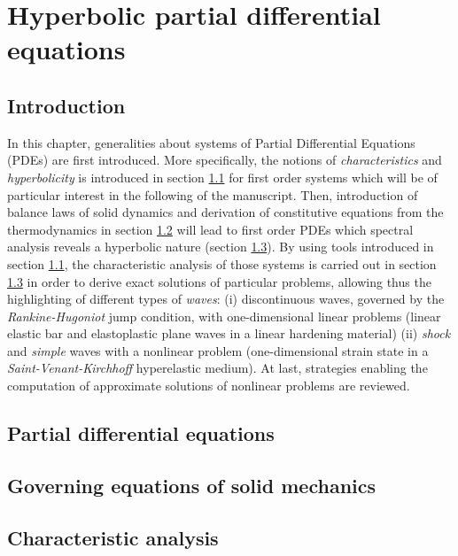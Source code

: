 \chapter{Hyperbolic partial differential equations}
\newpage
\section*{Introduction}
In this chapter, generalities about systems of Partial Differential Equations (PDEs) are first introduced. More specifically, the notions of \textit{characteristics} and \textit{hyperbolicity} is introduced in section \ref{sec:PDEs} for first order systems which will be of particular interest in the following of the manuscript.
Then, introduction of balance laws of solid dynamics and derivation of constitutive equations from the thermodynamics in section \ref{sec:solidMech_equations} will lead to first order PDEs which spectral analysis reveals a hyperbolic nature (section \ref{sec:characteristic_analysis}). By using tools introduced in section \ref{sec:PDEs}, the characteristic analysis of those systems is carried out in section \ref{sec:characteristic_analysis} in order to derive exact solutions of particular problems, allowing thus the highlighting of different types of \textit{waves}: (i) discontinuous waves, governed by the \textit{Rankine-Hugoniot} jump condition, with one-dimensional linear problems (linear elastic bar and elastoplastic plane waves in a linear hardening material) (ii) \textit{shock} and \textit{simple} waves with a nonlinear problem (one-dimensional strain state in a \textit{Saint-Venant-Kirchhoff} hyperelastic medium). At last, strategies enabling the computation of approximate solutions of nonlinear problems are reviewed.


\section{Partial differential equations}
\label{sec:PDEs}


\section{Governing equations of solid mechanics}
\label{sec:solidMech_equations}



\section{Characteristic analysis}
\label{sec:characteristic_analysis}



